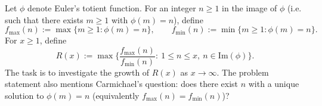 Let $\phi$ denote Euler's totient function. For an integer $n\ge 1$ in the image of $\phi$ (i.e. such that there exists $m\ge 1$ with $\phi(m)=n$), define
\[
 f_{\max}(n):=\max\{m\ge 1: \phi(m)=n\},\qquad
 f_{\min}(n):=\min\{m\ge 1: \phi(m)=n\}.
\]
For $x\ge 1$, define
\[
R(x):=\max\Big\{\frac{f_{\max}(n)}{f_{\min}(n)}:\ 1\le n\le x,\ n\in\mathrm{Im}(\phi)\Big\}.
\]
The task is to investigate the growth of $R(x)$ as $x\to\infty$. The problem statement also mentions Carmichael's question: does there exist $n$ with a unique solution to $\phi(m)=n$ (equivalently $f_{\max}(n)=f_{\min}(n)$)?
